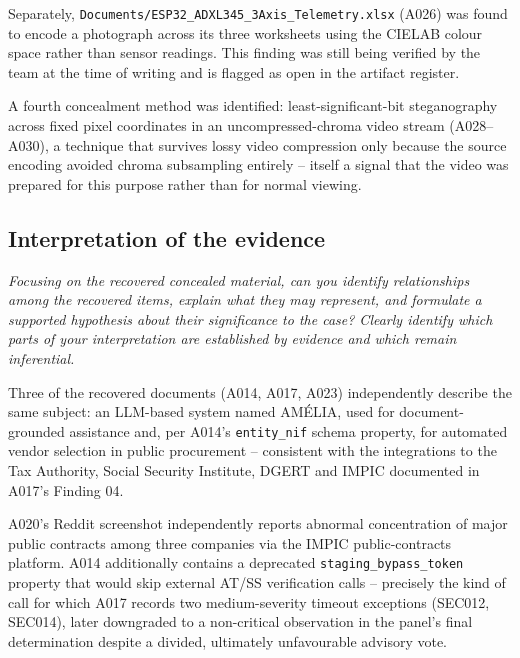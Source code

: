 \documentclass[11pt,a4paper,final,oneside]{article}
\begin{document}
Separately, \texttt{Documents/ESP32\_ADXL345\_3Axis\_Telemetry.xlsx} (A026) was found to encode
a photograph across its three worksheets using the CIELAB colour space rather than sensor
readings. This finding was still being verified by the team at the time of writing and is
flagged as open in the artifact register.

A fourth concealment method was identified: least-significant-bit steganography across fixed
pixel coordinates in an uncompressed-chroma video stream (A028--A030), a technique that
survives lossy video compression only because the source encoding avoided chroma subsampling
entirely -- itself a signal that the video was prepared for this purpose rather than for
normal viewing.

\subsection{Interpretation of the evidence}

\textit{Focusing on the recovered concealed material, can you identify relationships among the recovered items, explain what they may represent, and formulate a supported hypothesis about their significance to the case? Clearly identify which parts of your interpretation are established by evidence and which remain inferential.}


\label{sec:amelia-docs}
Three of the recovered documents (A014, A017, A023) independently describe the same subject: an
LLM-based system named AMÉLIA, used for document-grounded assistance and, per A014's
\texttt{entity\_nif} schema property, for automated vendor selection in public procurement --
consistent with the integrations to the Tax Authority, Social Security Institute, DGERT and
IMPIC documented in A017's Finding 04.

A020's Reddit screenshot independently reports abnormal concentration of major public contracts
among three companies via the IMPIC public-contracts platform. A014 additionally contains a
deprecated \texttt{staging\_bypass\_token} property that would skip external
AT/SS verification calls -- precisely the kind of call for which A017 records two
medium-severity timeout exceptions (SEC012, SEC014), later downgraded to a non-critical
observation in the panel's final determination despite a divided, ultimately unfavourable
advisory vote.
\end{document}
